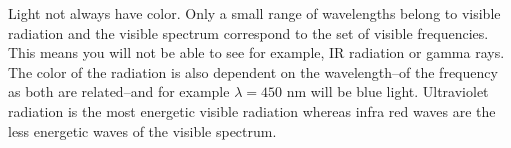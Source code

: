 \documentclass[main.tex]{subfiles}
\begin{document}
\begin{description}
Light not always have color. Only a small range of wavelengths belong to visible radiation and the visible spectrum correspond to the set of visible frequencies. This means you will not be able to see for example, IR radiation or gamma rays. The color of the radiation is also dependent on the wavelength--of the frequency as both are related--and for example $\lambda=450$ nm will be blue light. Ultraviolet radiation is the most energetic visible radiation whereas infra red waves are the less energetic waves of the visible spectrum.
%
%
%
%
%



\end{description}
\end{document}
